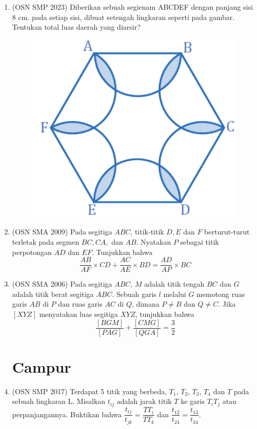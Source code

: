 \documentclass[12pt]{article}
\begin{document}
\begin{CJK*}{UTF8}{min}
\begin{enumerate}
    \item (OSN SMP 2023) Diberikan sebuah segienam ABCDEF dengan panjang sisi 8 cm. pada setiap sisi, dibuat setengah lingkaran seperti pada gambar. Tentukan total luas daerah yang diarsir?
    \begin{figure}[H]
    \centering
    \includegraphics[scale=0.5]{0Figure/osn-smp-2023-1.png}
    \end{figure}

    \item (OSN SMA 2009) Pada segitiga $ABC$, titik-titik $D, E$ dan $F$ berturut-turut terletak pada segmen $BC, CA,$ dan $AB$. Nyatakan $P$ sebagai titik perpotongan $AD$ dan $EF$. Tunjukkan bahwa
    $$
    \frac{AB}{AF} \times CD + \frac{AC}{AE} \times BD = \frac{AD}{AP} \times BC
    $$
    
    \item (OSN SMA 2006)
    Pada segitiga $ABC$, $M$ adalah titik tengah $BC$ dan $G$ adalah titik berat segitiga $ABC$. Sebuah garis $l$ melalui $G$ memotong ruas garis $AB$ di $P$ dan ruas garis $AC$ di $Q$, dimana $P \neq B$ dan $Q \neq C$. Jika $[XYZ]$ menyatakan luas segitiga $XYZ$, tunjukkan bahwa
    $$
    \frac{[BGM]}{[PAG]} + \frac{[CMG]}{[QGA]} = \frac{3}{2}
    $$

\newpage

\section{Campur}
    \item (OSN SMP 2017) Terdapat 5 titik yang berbeda, $T_{1}$, $T_{2}$, $T_{3}$, $T_{4}$ dan $T$ pada sebuah lingkaran L. Misalkan $t_{ij}$ adalah jarak titik $T$ ke garis $T_{i}T_{j}$ atau perpanjangannya. Buktikan bahwa $\dfrac{t_{ij}}{t_{jk}}=\dfrac{TT_{i}}{TT_{k}}$ dan $\dfrac{t_{12}}{t_{24}}=\dfrac{t_{13}}{t_{34}}$.
    \newline
\end{enumerate}
\end{CJK*}
\end{document}
